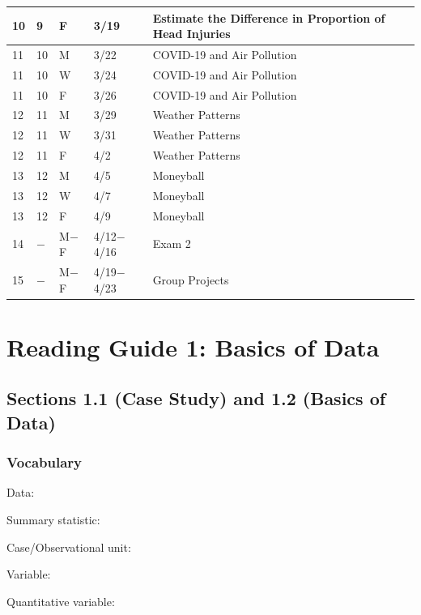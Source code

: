 \documentclass[
]{report}
\newcommand{\rgs}{\vspace{12pt}} %
\newcommand{\rgi}{\hspace{20pt}}  %
\begin{document}
\begin{longtable}{|p{}|l|p{}|l|p{}|}
10& 9& F& 3/19& Estimate the Difference in Proportion of Head Injuries \\ \hline
11& 10& M& 3/22& COVID-19 and Air Pollution \\*
11& 10& W& 3/24& COVID-19 and Air Pollution \\*	
11& 10& F& 3/26& COVID-19 and Air Pollution \\ \hline
12& 11& M& 3/29& Weather Patterns \\*
12& 11& W& 3/31& Weather Patterns \\*
12& 11& F& 4/2& Weather Patterns \\ \hline
13& 12& M& 4/5& Moneyball \\*
13& 12& W& 4/7& Moneyball \\*
13& 12& F& 4/9& Moneyball \\ \hline
14& $-$& M$-$F& 4/12$-$4/16& Exam 2 \\ \hline
15& $-$& M$-$F& 4/19$-$4/23& Group Projects \\ \hline
\end{longtable}

\hypertarget{reading-guide-1-basics-of-data}{%
\chapter{Reading Guide 1: Basics of Data}\label{reading-guide-1-basics-of-data}}

\hypertarget{sections-1.1-case-study-and-1.2-basics-of-data}{%
\section*{Sections 1.1 (Case Study) and 1.2 (Basics of Data)}\label{sections-1.1-case-study-and-1.2-basics-of-data}}

\hypertarget{vocabulary}{%
\subsection*{Vocabulary}\label{vocabulary}}


Data:
\rgs

Summary statistic:
\rgs

Case/Observational unit:
\rgs

Variable:
\rgs

\rgi Quantitative variable:
\rgs
\end{document}
